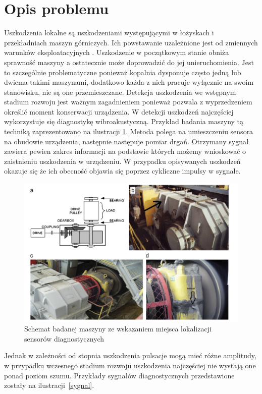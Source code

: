 \documentclass[inzynierska]{pwr_wmat_praca_dyplomowa}
\theoremstyle{plain}
\numberwithin{theorem}{chapter}
\theoremstyle{definition}
\numberwithin{theorem}{chapter}
\begin{document}
\section{Opis problemu}
Uszkodzenia lokalne są uszkodzeniami występującymi w łożyskach i przekładniach maszyn górniczych. Ich powstawanie uzależnione jest od zmiennych warunków eksploatacyjnych \cite{adaptacyjne}. Uszkodzenie w początkowym stanie obniża sprawność maszyny a ostatecznie może doprowadzić do jej unieruchomienia. Jest to szczególnie problematyczne ponieważ kopalnia dysponuje często jedną lub dwiema takimi maszynami, dodatkowo każda z nich pracuje wyłącznie na swoim stanowisku, nie są one przemieszczane.
 Detekcja uszkodzenia we wstępnym stadium rozwoju jest ważnym zagadnieniem ponieważ pozwala z wyprzedzeniem określić moment konserwacji urządzenia. W detekcji uszkodzeń najczęściej wykorzystuje się diagnostykę wibroakustyczną. Przykład badania maszyny tą techniką zaprezentowano na ilustracji \ref{sensory}. Metoda polega na umieszczeniu sensora na obudowie urządzenia, następnie następuje pomiar drgań. Otrzymany sygnał zawiera pewien zakres informacji na podstawie których możemy wnioskować o zaistnieniu uszkodzenia w urządzeniu. W przypadku opisywanych uszkodzeń okazuje się że ich obecność objawia się poprzez cykliczne impulsy w sygnale.
\begin{figure}[ht]

\centering
                     
\includegraphics[scale=0.5]{images/sensors.png}
\caption{Schemat badanej maszyny ze wskazaniem miejsca lokalizacji sensorów diagnostycznych}
\label{sensory}
\end{figure}
Jednak w zależności od stopnia uszkodzenia pulsacje mogą mieć różne amplitudy, w przypadku wczesnego stadium rozwoju uszkodzenia najczęściej nie wystają one ponad poziom szumu. Przykłady sygnałów diagnostycznych przedstawione zostały na ilustracji~\ref{sygnal}.
\end{document}
